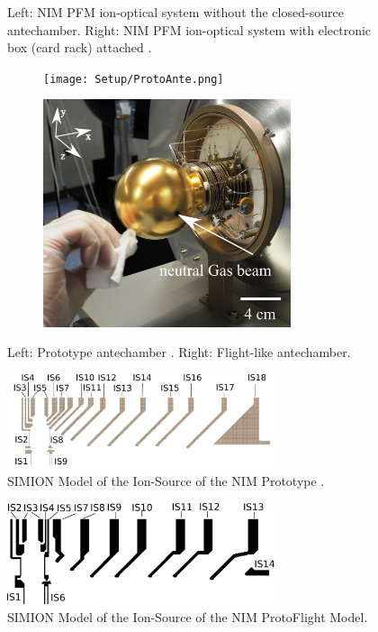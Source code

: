 \begin{figure}[h]
\begin{subfigure}{0.5\textwidth}
		\end{subfigure}
		\caption{Left: NIM PFM ion-optical system without the closed-source antechamber. Right: NIM PFM ion-optical system with electronic box (card rack) attached \cite{Foehn2021}.}
		\label{fig:SetupPFM}
	\end{figure}
	\begin{figure}[h!] %
		\begin{subfigure}{0.5\textwidth}
			\centering
			\texttt{[image: Setup/ProtoAnte.png]}
		\end{subfigure}
		\begin{subfigure}{0.5\textwidth}
			\centering
			\includegraphics[width = 0.8\textwidth]{Setup/FlightAnte.png}
		\end{subfigure}
		\caption{Left: Prototype antechamber \cite{Diss_Meyer}. Right: Flight-like antechamber.}
		\label{fig:SetupAntecham}
	\end{figure}
	\begin{figure}[h] %
		\centering
		\includegraphics[width= 0.7\textwidth]{Setup/Proto_IS_sim.png}
		\caption{SIMION Model of the Ion-Source of the NIM Prototype \cite{Diss_Meyer}.}
		\label{fig:SetupProtoISSim}
	\end{figure}
	\begin{figure}[h] %
		\centering
		\includegraphics[width=0.7\textwidth]{Setup/ISFlight_bearb.png}
		\caption{SIMION Model of the Ion-Source of the NIM ProtoFlight Model.}
		\label{fig:SetupPFMISSim}
	\end{figure}
